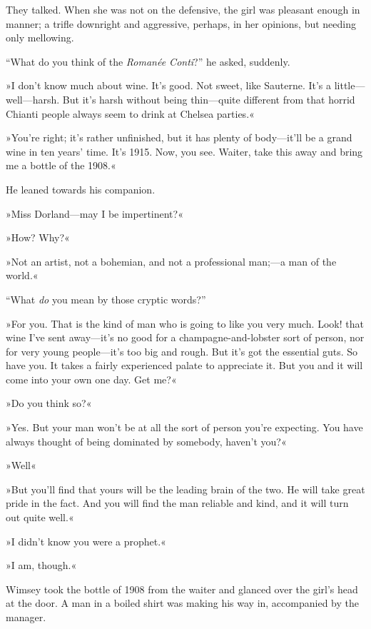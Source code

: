 They talked. When she was not on the defensive, the girl was pleasant enough in manner; a trifle downright and aggressive, perhaps, in her opinions, but needing only mellowing.

\enquote{What do you think of the \textit{Romanée Conti}?} he asked, suddenly.

»I don't know much about wine. It's good. Not sweet, like Sauterne. It's a little\allowbreak---\allowbreak well---harsh. But it's harsh without being thin\allowbreak---\allowbreak quite different from that horrid Chianti people always seem to drink at Chelsea parties.«

»You're right; it's rather unfinished, but it has plenty of body\allowbreak---\allowbreak it'll be a grand wine in ten years' time. It's 1915. Now, you see. Waiter, take this away and bring me a bottle of the 1908.«

He leaned towards his companion.

»Miss Dorland\allowbreak---\allowbreak may I be impertinent?«

»How? Why?«

»Not an artist, not a bohemian, and not a professional man;---a man of the world.«

\enquote{What \textit{do} you mean by those cryptic words?}

»For you. That is the kind of man who is going to like you very much. Look! that wine I've sent away\allowbreak---\allowbreak it's no good for a champagne-and-lobster sort of person, nor for very young people\allowbreak---\allowbreak it's too big and rough. But it's got the essential guts. So have you. It takes a fairly experienced palate to appreciate it. But you and it will come into your own one day. Get me?«

»Do you think so?«

»Yes. But your man won't be at all the sort of person you're expecting. You have always thought of being dominated by somebody, haven't you?«

»Well\longdash«

»But you'll find that yours will be the leading brain of the two. He will take great pride in the fact. And you will find the man reliable and kind, and it will turn out quite well.«

»I didn't know you were a prophet.«

»I am, though.«

Wimsey took the bottle of 1908 from the waiter and glanced over the girl's head at the door. A man in a boiled shirt was making his way in, accompanied by the manager.


